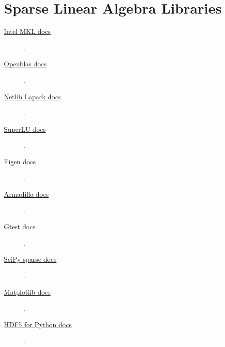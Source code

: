 \chapter{Sparse Linear Algebra Libraries}


\begin{description}
	\item[\href{https://www.intel.com/content/www/us/en/developer/tools/oneapi/onemkl-documentation.html}{Intel MKL docs}]

	      .

	\item[\href{http://www.openmathlib.org/OpenBLAS/docs}{Openblas docs}]

	      .

	\item[\href{https://www.netlib.org/lapack/explore-html}{Netlib Lapack docs}]

	      .

	\item[\href{https://portal.nersc.gov/project/sparse/superlu/superlu_code_html/index.html}{SuperLU docs}]

	      .

	\item[\href{https://eigen.tuxfamily.org/dox}{Eigen docs}]

	      .

	\item[\href{https://arma.sourceforge.net/docs.html}{Armadillo docs}]

	      .
\end{description}

\begin{description}
	\item[\href{https://google.github.io/googletest}{Gtest docs}]

	      .

	\item[\href{https://docs.scipy.org/doc/scipy/reference/sparse.html}{SciPy sparse docs}]

	      .

	\item[\href{https://matplotlib.org/stable/api/_as_gen/matplotlib.pyplot.plot.html}{Matplotlib docs}]

	      .

	\item[\href{https://docs.h5py.org/en/stable}{HDF5 for Python docs}]

	      .
\end{description}

